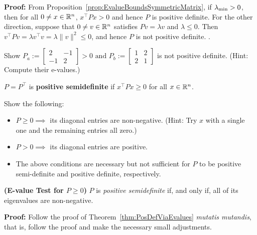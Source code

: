 \noindent \textbf{Proof:} From Proposition~\ref{prop:EvalueBoundsSymmetricMatrix}, if $\lambda_{\rm min} >0$, then for all $0 \neq x\in \mathbb R^n$, $x^\top P x >0$ and hence $P$ is positive definite. For the other direction, suppose that $0 \neq v \in \mathbb R^n$ satisfies $Pv = \lambda v$ and $\lambda \le 0$. Then $v^\top P v = \lambda v^\top v  = \lambda \| v \|^2 \le 0$, and hence $P$ is not positive definite. 
\Qed. 

\begin{exercise} Show
$P_a := \left[  \begin{array}{rr} 	 2 & -1 \\ 	 -1 & 2 	\end{array}	 \right] > 0 \text{ and } P_b := \left[  \begin{array}{rr} 	 1 & 2 \\ 	 2 & 1 	\end{array}	 \right]$ is not positive definite. (Hint: Compute their e-values.) 
\end{exercise}

\begin{definition}  $P=P^\top$ is \textbf{positive semidefinite} if $x^\top P x \geq 0$ for all $x \in \mathbb R^n$.
\end{definition}


\begin{exercise} Show the following:
\begin{itemize}
    \item $P\ge 0 \implies$ its diagonal entries are non-negative. (Hint: Try $x$ with a single one and the remaining entries all zero.) 
    \item $P > 0 \implies$ its diagonal entries are positive. 
    \item The above conditions are necessary but not sufficient for $P$ to be positive semi-definite and positive definite, respectively. 
\end{itemize}
\end{exercise}


\begin{thm} \textbf{(E-value Test for $P\ge 0$)}
\label{thm:PosSemiDefEvaluesNonNegative}
$P$ is \emph{positive semidefinite} if, and only if, all of its eigenvalues are non-negative.
\end{thm}

\textbf{Proof:} Follow the proof of Theorem~\ref{thm:PosDefViaEvalues} \emph{mutatis mutandis}, that is, follow the proof and make the necessary small adjustments.
\Qed

